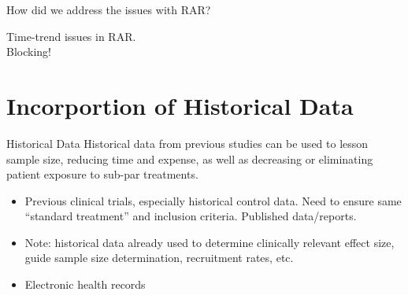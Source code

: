 \documentclass[12pt,t]{beamer}
\begin{document}
\begin{frame}{How did we address the issues with RAR?}
\vspace{12pt}

Time-trend issues in RAR. \\ 
\vspace{5pt}
{\color{vhilight} Blocking!} \\

\vspace{12pt}

\vspace{12pt}

\end{frame}




\section{Incorportion of Historical Data}


\begin{frame}{Historical Data}
Historical data from previous studies can be used to lesson sample size, reducing time and expense, as well as decreasing or eliminating patient exposure to sub-par treatments.

\begin{itemize}
\item Previous clinical trials, especially historical control data.  Need to ensure same “standard treatment” and inclusion criteria. Published data/reports. 

\item Note: historical data already used to determine clinically relevant effect size, guide sample size determination, recruitment rates, etc.

\item Electronic health records

\end{itemize}

\end{frame}
\end{document}
